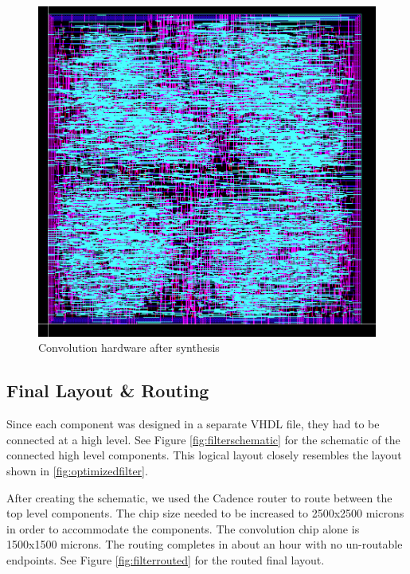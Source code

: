 \begin{figure}[htbp]
\centering
\includegraphics[width=6.5in]{images/CONV_MULT}
\caption{Convolution hardware after synthesis}
\label{fig:convmult}
\end{figure}


\subsection{Final Layout \& Routing}
Since each component was designed in a separate VHDL file, they had to be connected at a high level.  See Figure \ref{fig:filterschematic} for the schematic of the connected high level components.  This logical layout closely resembles the layout shown in \ref{fig:optimizedfilter}.

After creating the schematic, we used the Cadence router to route between the top level components.  The chip size needed to be increased to 2500x2500 microns in order to accommodate the components.  The convolution chip alone is 1500x1500 microns.  The routing completes in about an hour with no un-routable endpoints.  See Figure \ref{fig:filterrouted} for the routed final layout.


